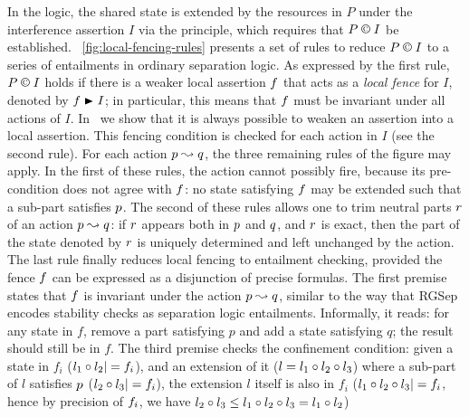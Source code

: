 In the logic, the shared state is extended by the resources in
$P$ under the interference assertion $I$ via the \extendRule principle,
which requires that $P\containI I$ be
established. \fig~\ref{fig:local-fencing-rules} presents a set of
rules to reduce $P \containI I$ to a series of entailments in
ordinary separation logic. As expressed by the first rule,
$P \containI I$ holds if there is a weaker local assertion $\lass{F}$
that acts as a \emph{local fence} for $I$, denoted by
$\lass{F}\strictfences I$; in particular, this means that $\lass{F}$
must be invariant under all actions of $I$. In~\cite{colosl-tr14}
we show that it is always possible to weaken an assertion into a local assertion. This fencing condition is
checked for each action in $I$ (see the second rule). For each action
$\lass{P}\swap \lass{Q}$, the three remaining rules of the figure may
apply. In the first of these rules, the action cannot possibly fire,
because its pre-condition does not agree with $\lass{F}$: no state
satisfying $\lass{F}$ may be extended such that a sub-part satisfies
$\lass{P}$. 
The second of these rules allows one to trim neutral parts
$\lass{R}$ of an action $\lass{P}\swap \lass{Q}$: if $\lass{R}$
appears both in $\lass{P}$ and $\lass{Q}$, and $\lass{R}$ is exact,
then the part of the state denoted by $\lass{R}$ is uniquely
determined and left unchanged by the action. 
The last rule finally reduces local fencing to entailment checking, provided the fence
$\lass{F}$ can be expressed as a disjunction of precise formulas. The
first premise states that $\lass{F}$ is invariant under the action
$\lass{P}\swap \lass{Q}$, similar to the way that RGSep encodes
stability checks as separation logic entailments. Informally, it
reads: for any state in $f$, remove a part satisfying $p$ and add a
state satisfying $q$; the result should still be in $f$. The third
premise checks the confinement condition: given a state in $f_i$ ($l_1\composeL l_2|= \lass{F}_i$), and an extension of it ($l = l_1 \circ l_2 \circ l_3$) where a sub-part of $l$ satisfies $\lass{P}$ ($l_2 \circ l_3 |= f_i$), the extension $l$ itself is also in $f_i$ ($l_1\composeL l_2\composeL
l_3|=\lass{F}_i$, hence by precision of $\lass{F}_i$, we have $l_2\circ
l_3\leq l_1\circ l_2\circ l_3 = l_1\circ l_2$)

